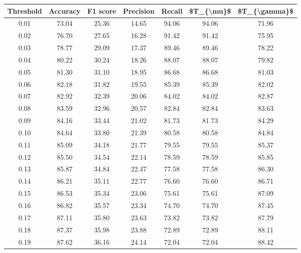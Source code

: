 \begin{tabular}{|c|c|c|c|c|c|c|}
\hline
 Threshold &  Accuracy &  F1 score &  Precision &  Recall &  \$T\_\{\textbackslash mu\}\$ &  \$T\_\{\textbackslash gamma\}\$ \\
\hline
      0.01 &     73.04 &     25.36 &      14.65 &   94.06 &      94.06 &         71.96 \\
      0.02 &     76.70 &     27.65 &      16.28 &   91.42 &      91.42 &         75.95 \\
      0.03 &     78.77 &     29.09 &      17.37 &   89.46 &      89.46 &         78.22 \\
      0.04 &     80.22 &     30.24 &      18.26 &   88.07 &      88.07 &         79.82 \\
      0.05 &     81.30 &     31.10 &      18.95 &   86.68 &      86.68 &         81.03 \\
      0.06 &     82.18 &     31.82 &      19.55 &   85.39 &      85.39 &         82.02 \\
      0.07 &     82.92 &     32.39 &      20.06 &   84.02 &      84.02 &         82.87 \\
      0.08 &     83.59 &     32.96 &      20.57 &   82.84 &      82.84 &         83.63 \\
      0.09 &     84.16 &     33.44 &      21.02 &   81.73 &      81.73 &         84.29 \\
      0.10 &     84.64 &     33.80 &      21.39 &   80.58 &      80.58 &         84.84 \\
      0.11 &     85.09 &     34.18 &      21.77 &   79.55 &      79.55 &         85.37 \\
      0.12 &     85.50 &     34.54 &      22.14 &   78.59 &      78.59 &         85.85 \\
      0.13 &     85.87 &     34.84 &      22.47 &   77.58 &      77.58 &         86.30 \\
      0.14 &     86.21 &     35.11 &      22.77 &   76.60 &      76.60 &         86.71 \\
      0.15 &     86.53 &     35.34 &      23.06 &   75.61 &      75.61 &         87.09 \\
      0.16 &     86.82 &     35.57 &      23.34 &   74.70 &      74.70 &         87.45 \\
      0.17 &     87.11 &     35.80 &      23.63 &   73.82 &      73.82 &         87.79 \\
      0.18 &     87.37 &     35.98 &      23.88 &   72.89 &      72.89 &         88.11 \\
      0.19 &     87.62 &     36.16 &      24.14 &   72.04 &      72.04 &         88.42 \\

\end{tabular}
